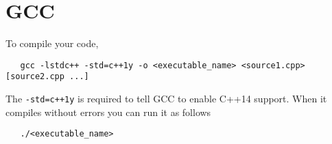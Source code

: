 \documentclass{article}
\begin{document}
\section{GCC}
To compile your code,
\begin{verbatim}
   gcc -lstdc++ -std=c++1y -o <executable_name> <source1.cpp> [source2.cpp ...]
\end{verbatim}
The \texttt{-std=c++1y} is required to tell GCC to enable C++14 support. When it compiles without
errors you can run it as follows
\begin{verbatim}
   ./<executable_name>
\end{verbatim}
\end{document}

